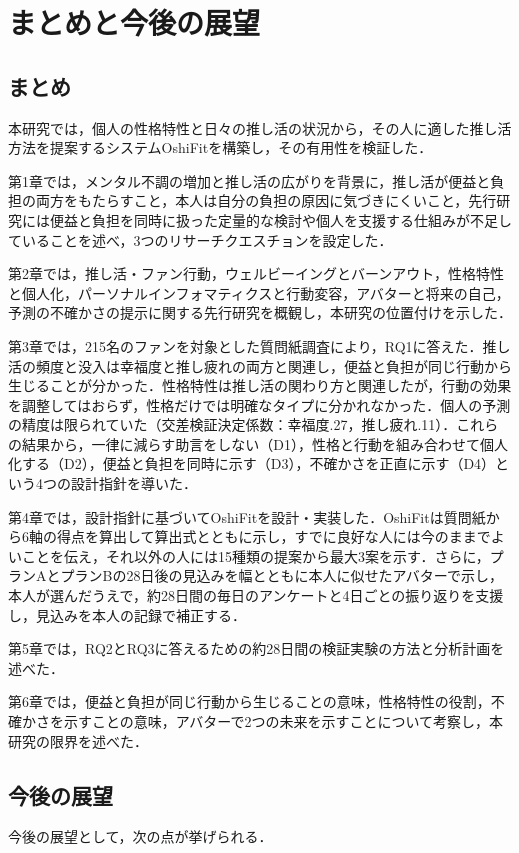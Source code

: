 \chapter{まとめと今後の展望}

\section{まとめ}
本研究では，個人の性格特性と日々の推し活の状況から，その人に適した推し活方法を提案するシステムOshiFitを構築し，その有用性を検証した．

第1章では，メンタル不調の増加と推し活の広がりを背景に，推し活が便益と負担の両方をもたらすこと，本人は自分の負担の原因に気づきにくいこと，先行研究には便益と負担を同時に扱った定量的な検討や個人を支援する仕組みが不足していることを述べ，3つのリサーチクエスチョンを設定した．

第2章では，推し活・ファン行動，ウェルビーイングとバーンアウト，性格特性と個人化，パーソナルインフォマティクスと行動変容，アバターと将来の自己，予測の不確かさの提示に関する先行研究を概観し，本研究の位置付けを示した．

第3章では，215名のファンを対象とした質問紙調査により，RQ1に答えた．推し活の頻度と没入は幸福度と推し疲れの両方と関連し，便益と負担が同じ行動から生じることが分かった．性格特性は推し活の関わり方と関連したが，行動の効果を調整してはおらず，性格だけでは明確なタイプに分かれなかった．個人の予測の精度は限られていた（交差検証決定係数：幸福度.27，推し疲れ.11）．これらの結果から，一律に減らす助言をしない（D1），性格と行動を組み合わせて個人化する（D2），便益と負担を同時に示す（D3），不確かさを正直に示す（D4）という4つの設計指針を導いた．

第4章では，設計指針に基づいてOshiFitを設計・実装した．OshiFitは質問紙から6軸の得点を算出して算出式とともに示し，すでに良好な人には今のままでよいことを伝え，それ以外の人には15種類の提案から最大3案を示す．さらに，プランAとプランBの28日後の見込みを幅とともに本人に似せたアバターで示し，本人が選んだうえで，約28日間の毎日のアンケートと4日ごとの振り返りを支援し，見込みを本人の記録で補正する．

第5章では，RQ2とRQ3に答えるための約28日間の検証実験の方法と分析計画を述べた．

第6章では，便益と負担が同じ行動から生じることの意味，性格特性の役割，不確かさを示すことの意味，アバターで2つの未来を示すことについて考察し，本研究の限界を述べた．

\section{今後の展望}
今後の展望として，次の点が挙げられる．

